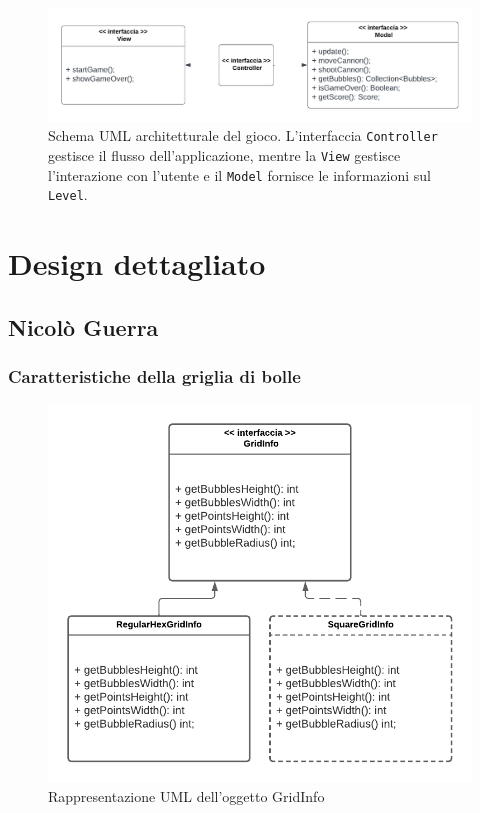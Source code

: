 \documentclass[a4paper,12pt]{report}
\begin{document}
\begin{figure}[h]
	\centering{}
	\includegraphics[width=\textwidth]{img/arch.pdf}
	\caption{Schema UML architetturale del gioco. L'interfaccia \texttt{Controller} gestisce il flusso dell'applicazione, mentre la \texttt{View} gestisce l'interazione con l'utente e il \texttt{Model} fornisce le informazioni sul \texttt{Level}.}
\end{figure}

\section{Design dettagliato}
\subsection{Nicolò Guerra}
\subsubsection{Caratteristiche della griglia di bolle}

\begin{figure}[H]
	\centering{}
	\includegraphics[width=\textwidth]{img/strategy_gridinfo.pdf}
	\caption{Rappresentazione UML dell'oggetto GridInfo}
\end{figure}
\end{document}
